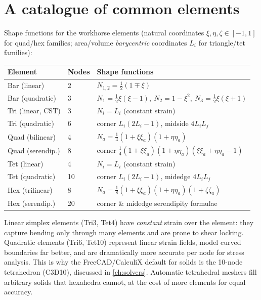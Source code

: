 \section{A catalogue of common elements}

Shape functions for the workhorse elements (natural coordinates
$\xi,\eta,\zeta\in[-1,1]$ for quad/hex families; area/volume
\emph{barycentric} coordinates $L_i$ for triangle/tet families):

\begin{center}
\begin{tabularx}{\linewidth}{p{3.1cm}p{1.1cm}X}
  \toprule
  Element & Nodes & Shape functions \\
  \midrule
  Bar (linear)     & 2 & $N_{1,2}=\tfrac12(1\mp\xi)$ \\
  Bar (quadratic)  & 3 & $N_1=\tfrac12\xi(\xi-1),\ N_2=1-\xi^2,\ N_3=\tfrac12\xi(\xi+1)$ \\
  Tri (linear, CST)& 3 & $N_i=L_i$ (constant strain) \\
  Tri (quadratic)  & 6 & corner $L_i(2L_i-1)$, midside $4L_iL_j$ \\
  Quad (bilinear)  & 4 & $N_a=\tfrac14(1+\xi\xi_a)(1+\eta\eta_a)$ \\
  Quad (serendip.) & 8 & corner $\tfrac14(1+\xi\xi_a)(1+\eta\eta_a)(\xi\xi_a+\eta\eta_a-1)$ \\
  Tet (linear)     & 4 & $N_i=L_i$ (constant strain) \\
  Tet (quadratic)  & 10& corner $L_i(2L_i-1)$, midedge $4L_iL_j$ \\
  Hex (trilinear)  & 8 & $N_a=\tfrac18(1+\xi\xi_a)(1+\eta\eta_a)(1+\zeta\zeta_a)$ \\
  Hex (serendip.)  & 20& corner \& midedge serendipity formulae \\
  \bottomrule
\end{tabularx}
\end{center}

\begin{remark}
Linear simplex elements (Tri3, Tet4) have \emph{constant} strain over the
element: they capture bending only through many elements and are prone to
shear locking. Quadratic elements (Tri6, Tet10) represent linear strain
fields, model curved boundaries far better, and are dramatically more
accurate per node for stress analysis. This is why the FreeCAD/CalculiX
default for solids is the 10-node tetrahedron (C3D10), discussed in
\cref{ch:solvers}. Automatic tetrahedral meshers fill arbitrary solids
that hexahedra cannot, at the cost of more elements for equal accuracy.
\end{remark}

